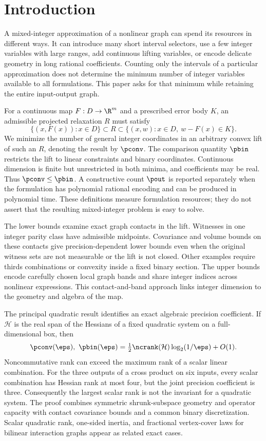 \section{Introduction}\label{sec:introduction}

A mixed-integer approximation of a nonlinear graph can spend its resources
in different ways. It can introduce many short interval selectors, use a
few integer variables with large ranges, add continuous lifting variables,
or encode delicate geometry in long rational coefficients. Counting only
the intervals of a particular approximation does not determine the minimum
number of integer variables available to all formulations. This paper asks
for that minimum while retaining the entire input-output graph.

For a continuous map $F:D\to\R^m$ and a prescribed error body $K$, an
admissible projected relaxation $R$ must satisfy
\[
 \{(x,F(x)):x\in D\}\subset R
 \subset\{(x,w):x\in D,\ w-F(x)\in K\}.
\]
We minimize the number of general integer coordinates in an arbitrary
convex lift of such an $R$, denoting the result by $\pconv$.
The comparison quantity $\pbin$ restricts the lift to linear constraints
and binary coordinates. Continuous dimension is finite but unrestricted
in both minima, and coefficients may be real. Thus $\pconv\le\pbin$.
A constructive count $\pout$ is reported separately when the formulation
has polynomial rational encoding and can be produced in polynomial time.
These definitions measure formulation resources; they do not assert that
the resulting mixed-integer problem is easy to solve.

The lower bounds examine exact graph contacts in the lift. Witnesses in
one integer parity class have admissible midpoints. Covariance and volume
bounds on these contacts give precision-dependent lower bounds even when
the original witness sets are not measurable or the lift is not closed.
Other examples require thirds combinations or convexity inside a fixed
binary section. The upper bounds encode carefully chosen local graph bands
and share integer indices across nonlinear expressions. This contact-and-band
approach links integer dimension to the geometry and algebra of the map.

The principal quadratic result identifies an exact algebraic precision
coefficient. If $\mathcal H$ is the real span of the Hessians of a fixed
quadratic system on a full-dimensional box, then
\begin{equation}\label{eq:intro-ncrank}
 \pconv(\eps),\ \pbin(\eps)
 =\tfrac12\ncrank(\mathcal H)\log_2(1/\eps)+O(1).
\end{equation}
Noncommutative rank can exceed the maximum rank of a scalar linear
combination. For the three outputs of a cross product on six inputs,
every scalar combination has Hessian rank at most four, but the joint
precision coefficient is three. Consequently the largest scalar rank is
not the invariant for a quadratic system. The proof combines symmetric
shrunk-subspace geometry and operator capacity with contact covariance
bounds and a common binary discretization. Scalar quadratic rank,
one-sided inertia, and fractional vertex-cover laws for bilinear
interaction graphs appear as related exact cases.


